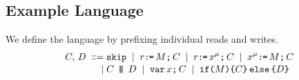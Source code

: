 \subsection{Example Language}
\begin{comment}
\footnote{We only consider executions where register state is empty in
  forked threads.  Given requirement~\ref{pre-acquire}, a sufficient condition is that parallel
  composition is always preceded by an acquire fence, as in programs of the
  form:
  \begin{displaymath}
    \VAR\vec{\aLoc}\SEMI
    \vec{\aLoc}\GETS\vec{0}\SEMI
    \vec{\bLoc}\GETS\vec{0}\SEMI
    \FENCE\SEMI
    (\aCmd^1 \PAR \cdots \PAR \aCmd^n)
  \end{displaymath}
  where $\aCmd^1$, \ldots, $\aCmd^n$ do not include $\PAR$.  To avoid clutter
  in drawings, we often drop the explicit fence.}.
\end{comment}


We define the language by prefixing individual reads and writes.  %
\begin{align*}
\aCmd,\,\bCmd
\BNFDEF& \SKIP
\BNFSEP \aReg\GETS\aExp\SEMI \aCmd
\BNFSEP \aReg\GETS\aLoc^{\amode}\SEMI \aCmd 
\BNFSEP \aLoc^{\amode}\GETS\aExp\SEMI \aCmd
\\[-.5ex]
\BNFSEP&\aCmd \PAR[\aThrd][\bThrd] \bCmd
\BNFSEP \VAR\aLoc\SEMI \aCmd
\BNFSEP \IF{\aExp} \THEN \aCmd \ELSE \bCmd \FI
\end{align*}




